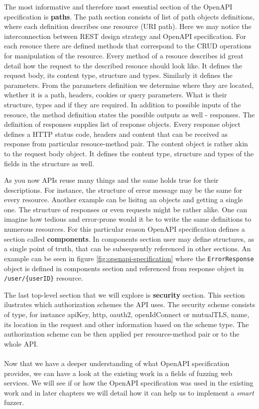 The most informative and therefore most essential section of the OpenAPI specification is \textbf{paths}. The path section consists of list of path objects definitions, where each definition describes one resource (URI path). Here we may notice the interconnection between REST design strategy and OpenAPI specification. For each resouce there are defined methods that correspond to the CRUD operations for manipulation of the resource. Every method of a resouce describes id great detail how the request to the described resouce should look like. It defines the request body, its content type, structure and types. Similarly it defines the parameters. From the parameters definition we determine where they are located, whether it is a path, headers, cookies or query parameters. What is their structure, types and if they are required. In addition to possible inputs of the resouce, the method definition states the possible outputs as well - responses. The definition of responses supplies list of response objects. Every response object defines a HTTP status code, headers and content that can be received as response from particular resouce-method pair. The content object is rather akin to the request body object. It defines the content type, structure and types of the fields in the structure as well.

\label{subsec:components}
As you now APIs reuse many things and the same holds true for their descriptions. For instance, the structure of error message may be the same for every resource. Another example can be lisitng an objects and getting a single one. The structure of responses or even requests might be rather alike. One can imagine how tedious and error-prone would it be to write the same definitions to numerous resources. For this particular reason OpenAPI specification defines a section called \textbf{components}. In components section user may define structures, as a single point of truth, that can be subsequently referenced in other sections. An example can be seen in figure \ref{fig:openapi-specification} where the \texttt{ErrorResponse} object is defined in components section and referenced from response object in \texttt{/user/\{userID\}} resource.

The last top-level section that we will explore is \textbf{security} section. This section ilustrates which authorization schemes the API uses. The security scheme consists of type, for instance apiKey, http, oauth2, openIdConnect or mutualTLS, name, its location in the request and other information based on the scheme type. The authorization scheme can be then applied per resource-method pair or to the whole API.


\paragraph{}
Now that we have a deeper understanding of what OpenAPI specification provides, we can have a look at the existing work in a fields of fuzzing web services. We will see if or how the OpenAPI specification was used in the existing work and in later chapters we will detail how it can help us to implement a \emph{smart} fuzzer.
